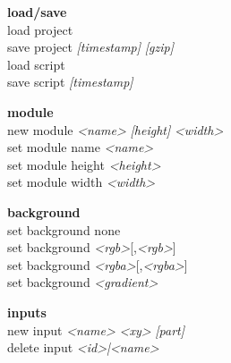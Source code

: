 \documentclass[a4paper,10pt,oneside]{article}
\begin{document}
\fboxrule=0.5mm
\fboxsep=0.25cm

\begin{tcolorbox}[width=7.5cm]
  \begin{minipage}{7.5cm}
    \begin{flushleft}
      \textbf{load/save} \\
      load project \\
      save project \textit{[timestamp]} \textit{[gzip]} \\
      load script \\
      save script \textit{[timestamp]} \\
    \end{flushleft}
  \end{minipage}
\end{tcolorbox}

\begin{tcolorbox}[width=7.5cm]
  \begin{minipage}{7.5cm}
    \begin{flushleft}
      \textbf{module} \\
      new module \textit{<name>} \textit{[height]} \textit{<width>} \\
      set module name \textit{<name>} \\
      set module height \textit{<height>} \\
      set module width  \textit{<width>}
    \end{flushleft}
  \end{minipage}
\end{tcolorbox}

\begin{tcolorbox}[width=7.5cm]
  \begin{minipage}{7.5cm}
    \begin{flushleft}
    \textbf{background} \\
    set background none \\
    set background \textit{<rgb>}[,\textit{<rgb>}] \\
    set background \textit{<rgba>}[,\textit{<rgba>}] \\
    set background \textit{<gradient>} \\
    \end{flushleft}
  \end{minipage}
\end{tcolorbox}

\begin{tcolorbox}[width=7.5cm]
  \begin{minipage}{7.5cm}
    \begin{flushleft}
    \textbf{inputs} \\
    new input \textit{<name>} \textit{<xy>} \textit{[part]} \\
    delete input \textit{<id>|<name>}\\
    \end{flushleft}
  \end{minipage}
\end{tcolorbox}
\end{document}
